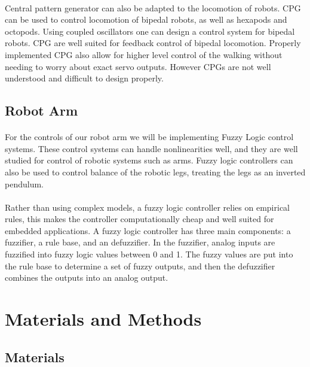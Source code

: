 \documentclass[titlepage,letterpaper,12pt]{article}
\begin{document}
\paragraph{}Central pattern generator can also be adapted to the locomotion of
robots. CPG can be used to control locomotion of bipedal robots, as well as
hexapods and octopods. Using coupled oscillators one can design a control system
for bipedal robots. CPG are well suited for feedback control of bipedal
locomotion. Properly implemented CPG also allow for higher level control of the
walking without needing to worry about exact servo outputs. However CPGs are not
well understood and difficult to design properly\cite{Ijspeert2008}.

\subsection{Robot Arm}
\paragraph{}For the controls of our robot arm we will be implementing Fuzzy
Logic control systems. These control systems can handle nonlinearities well, and
they are well studied for control of robotic systems such as
arms\cite{Scharf1985}.  Fuzzy logic controllers can also be used to control
balance of the robotic legs, treating the legs as an inverted
pendulum\cite{hwang1992stability}.

\paragraph{}Rather than using complex models, a fuzzy logic controller relies on
empirical rules, this makes the controller computationally cheap and well suited
for embedded applications. A fuzzy logic controller has three main components: a
fuzzifier, a rule base, and an defuzzifier. In the fuzzifier, analog inputs are
fuzzified into fuzzy logic values between 0 and 1. The fuzzy values are put into
the rule base to determine a set of fuzzy outputs, and then the defuzzifier
combines the outputs into an analog output\cite{Mailah2000}.

\section{Materials and Methods}
\subsection{Materials}
\end{document}
